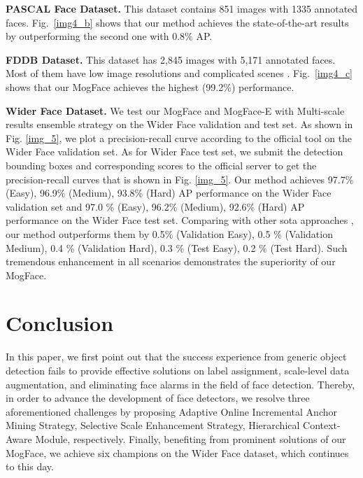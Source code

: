 \documentclass[10pt,twocolumn,letterpaper]{article}
\begin{document}
\noindent \textbf{PASCAL Face Dataset.} This dataset contains 851 images with 1335 annotated faces. Fig.~\ref{img4_b} shows that our method achieves the state-of-the-art results by outperforming the second one with $0.8\%$ AP. 

\noindent \textbf{FDDB Dataset.} This dataset has 2,845 images with 5,171 annotated faces. Most of them have low image resolutions and complicated scenes
. Fig.~\ref{img4_c} shows that our MogFace achieves the highest (99.2\%) performance.


\noindent\textbf{Wider Face Dataset.} We test our MogFace and MogFace-E with Multi-scale results ensemble strategy on the Wider Face validation and test set. As shown in Fig. \ref{img_5}, we plot a precision-recall curve according to the official tool on the Wider Face validation set.  As for Wider Face test set, we submit the detection bounding boxes and corresponding scores to the official server to get the precision-recall curves that is shown in Fig. \ref{img_5}. Our method achieves 97.7\% (Easy), 96.9\% (Medium), 93.8\% (Hard) AP performance on the Wider Face validation set and 97.0 \% (Easy), 96.2\% (Medium), 92.6\% (Hard) AP performance on the Wider Face test set. Comparing with other sota approaches  \cite{hu2017finding,wang2017detecting,li2019dsfd, wang2017face, chi2019selective,zhang2018face, zhu2018seeing, cai2016unified,zhu2017cms,zhang2020asfd}, our method outperforms them by  0.5\% (Validation Easy), 0.5 \% (Validation Medium), 0.4 \% (Validation Hard), 0.3 \% (Test Easy), 0.2 \% (Test Hard). Such tremendous enhancement in all scenarios demonstrates the superiority of our MogFace.

\section{Conclusion}
In this paper,  we first point out that the success experience from generic object detection fails to provide effective solutions on  label assignment, scale-level data augmentation, and eliminating face alarms in the field of face detection. 
Thereby, in order to advance the development of face detectors, we resolve three aforementioned challenges by proposing Adaptive Online Incremental Anchor Mining Strategy, Selective Scale Enhancement Strategy, Hierarchical Context-Aware Module, respectively. Finally, benefiting from prominent solutions of our MogFace,  we achieve six champions on the Wider Face dataset, which continues to this day. 

\newpage

{\small


}
\end{document}
